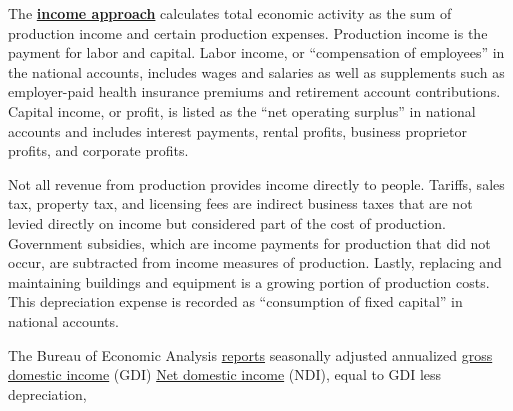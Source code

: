 \begin{minipage}{0.76\textwidth}
\small The \textbf{\href{https://www.bea.gov/help/glossary/income-approach}{income approach}} calculates total economic activity as the sum of production income and certain production expenses. Production income is the payment for labor and capital. Labor income, or ``compensation of employees'' in the national accounts, includes wages and salaries as well as supplements such as employer-paid health insurance premiums and retirement account contributions. Capital income, or profit, is listed as the ``net operating surplus'' in national accounts and includes interest payments, rental profits, business proprietor profits, and corporate profits.

Not all revenue from production provides income directly to people. Tariffs, sales tax, property tax, and licensing fees are indirect business taxes that are not levied directly on income but considered part of the cost of production. Government subsidies, which are income payments for production that did not occur, are subtracted from income measures of production. Lastly, replacing and maintaining buildings and equipment is a growing portion of production costs. This depreciation expense is recorded as ``consumption of fixed capital'' in national accounts.

The Bureau of Economic Analysis \href{https://www.bea.gov/data/gdp/gross-domestic-product}{reports} seasonally adjusted annualized \href{https://www.bea.gov/help/glossary/gross-domestic-income-gdi}{gross domestic income} (GDI)  \href{https://www.bea.gov/help/glossary/net-domestic-income-ndi}{Net domestic income} (NDI), equal to GDI less depreciation, 
\end{minipage}
\vspace{1mm}

